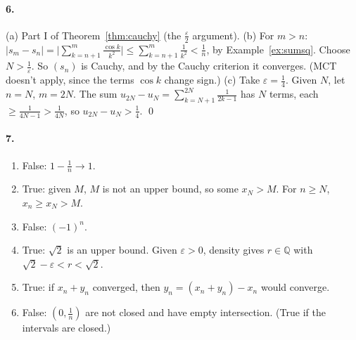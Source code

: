 \documentclass[11pt]{article}
\theoremstyle{definition}
\newcommand{\Q}{\mathbb{Q}}
\newcommand{\eps}{\varepsilon}
\begin{document}
\paragraph{6.} (a) Part I of Theorem~\ref{thm:cauchy} (the $\frac\eps2$
argument).
(b) For $m>n$: $|s_m-s_n|=\bigl|\sum_{k=n+1}^m\frac{\cos k}{k^2}\bigr|
\le\sum_{k=n+1}^m\frac1{k^2}<\frac1n$, by
Example~\ref{ex:sumsq}. Choose $N>\frac1\eps$. So $(s_n)$ is Cauchy, and
by the Cauchy criterion it converges. (MCT doesn't apply, since the terms
$\cos k$ change sign.)
(c) Take $\eps=\frac14$. Given $N$, let $n=N$, $m=2N$. The sum
$u_{2N}-u_N=\sum_{k=N+1}^{2N}\frac1{2k-1}$ has $N$ terms, each
$\ge\frac1{4N-1}>\frac1{4N}$, so $u_{2N}-u_N>\frac14$. \qed

\paragraph{7.}
\begin{enumerate}[label=(\alph*),nosep]
  \item False: $1-\frac1n\to1$.
  \item True: given $M$, $M$ is not an upper bound, so some $x_N>M$. For
        $n\ge N$, $x_n\ge x_N>M$.
  \item False: $(-1)^n$.
  \item True: $\sqrt2$ is an upper bound. Given $\eps>0$, density gives
        $r\in\Q$ with $\sqrt2-\eps<r<\sqrt2$.
  \item True: if $x_n+y_n$ converged, then $y_n=(x_n+y_n)-x_n$ would
        converge.
  \item False: $(0,\frac1n)$ are not closed and have empty intersection.
        (True if the intervals are closed.)
\end{enumerate}
\end{document}
